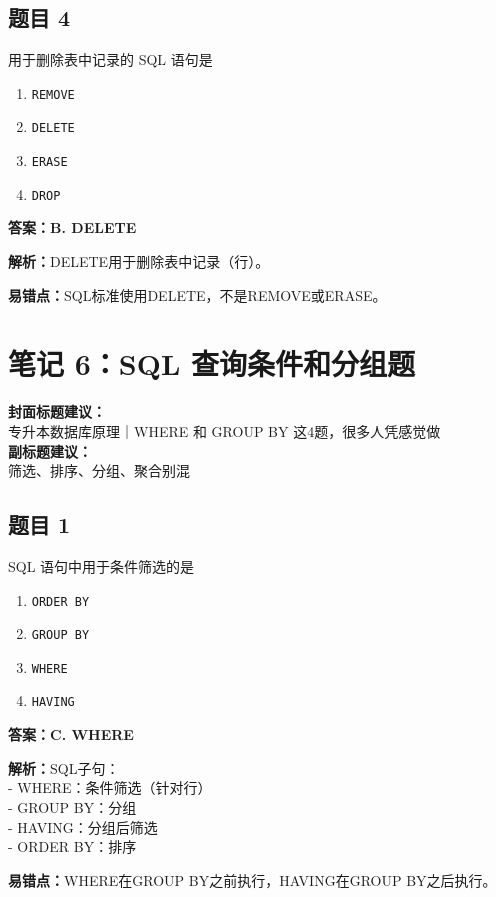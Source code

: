 \documentclass[12pt,a4paper]{ctexart}
\begin{document}
\subsection*{题目 4}
用于删除表中记录的 SQL 语句是
\begin{enumerate}[label=\Alph*.]
	\item \texttt{REMOVE}
	\item \texttt{DELETE}
	\item \texttt{ERASE}
	\item \texttt{DROP}
\end{enumerate}

\begin{answerbox}
	\textbf{答案：B. DELETE}

	\textbf{解析：}DELETE用于删除表中记录（行）。

	\textbf{易错点：}SQL标准使用DELETE，不是REMOVE或ERASE。
\end{answerbox}

\newpage

\section{笔记 6：SQL 查询条件和分组题}
\begin{coverbox}
	\textbf{封面标题建议：}\\
	专升本数据库原理｜WHERE 和 GROUP BY 这4题，很多人凭感觉做\\
	\textbf{副标题建议：}\\
	筛选、排序、分组、聚合别混
\end{coverbox}

\subsection*{题目 1}
SQL 语句中用于条件筛选的是
\begin{enumerate}[label=\Alph*.]
	\item \texttt{ORDER BY}
	\item \texttt{GROUP BY}
	\item \texttt{WHERE}
	\item \texttt{HAVING}
\end{enumerate}

\begin{answerbox}
	\textbf{答案：C. WHERE}

	\textbf{解析：}SQL子句：\\
	- WHERE：条件筛选（针对行）\\
	- GROUP BY：分组\\
	- HAVING：分组后筛选\\
	- ORDER BY：排序

	\textbf{易错点：}WHERE在GROUP BY之前执行，HAVING在GROUP BY之后执行。
\end{answerbox}
\end{document}
